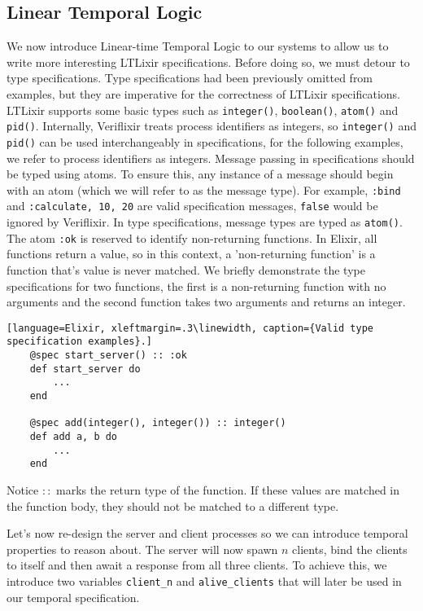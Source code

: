 \subsection{Linear Temporal Logic}
We now introduce Linear-time Temporal Logic to our systems to allow us to write more interesting LTLixir specifications. Before doing so, we must detour to type specifications. Type specifications had been previously omitted from examples, but they are imperative for the correctness of LTLixir specifications. LTLixir supports some basic types such as \texttt{integer()}, \texttt{boolean()}, \texttt{atom()} and \texttt{pid()}. Internally, Veriflixir treats process identifiers as integers, so \texttt{integer()} and \texttt{pid()} can be used interchangeably in specifications, for the following examples, we refer to process identifiers as integers. Message passing in specifications should be typed using atoms. To ensure this, any instance of a message should begin with an atom (which we will refer to as the message type). For example, \texttt{{:bind}} and \texttt{{:calculate, 10, 20}} are valid specification messages, \texttt{{false}} would be ignored by Veriflixir. In type specifications, message types are typed as \texttt{atom()}. The atom \texttt{:ok} is reserved to identify non-returning functions. In Elixir, all functions return a value, so in this context, a 'non-returning function' is a function that's value is never matched. We briefly demonstrate the type specifications for two functions, the first is a non-returning function with no arguments and the second function takes two arguments and returns an integer.
\begin{lstlisting}[language=Elixir, xleftmargin=.3\linewidth, caption={Valid type specification examples}.]
    @spec start_server() :: :ok
    def start_server do
        ...
    end

    @spec add(integer(), integer()) :: integer()
    def add a, b do
        ...
    end
\end{lstlisting}
Notice $::$ marks the return type of the function. If these values are matched in the function body, they should not be matched to a different type.
\par
Let's now re-design the server and client processes so we can introduce temporal properties to reason about. The server will now spawn $n$ clients, bind the clients to itself and then await a response from all three clients. To achieve this, we introduce two variables \texttt{client\_n} and \texttt{alive\_clients} that will later be used in our temporal specification.
